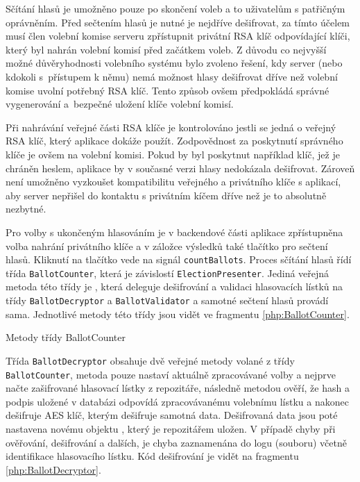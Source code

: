 Sčítání hlasů je umožněno pouze po skončení voleb a to uživatelům s patřičným oprávněním. Před sečtením hlasů je nutné je nejdříve dešifrovat, za tímto účelem musí člen volební komise serveru zpřístupnit privátní RSA klíč odpovídající klíči, který byl nahrán volební komisí před začátkem voleb. Z důvodu co nejvyšší možné důvěryhodnosti volebního systému bylo zvoleno řešení, kdy server (nebo kdokoli s~přístupem k němu) nemá možnost hlasy dešifrovat dříve než volební komise uvolní potřebný RSA klíč. Tento způsob ovšem předpokládá správné vygenerování a~bezpečné uložení klíče volební komisí.

Při nahrávání veřejné části RSA klíče je kontrolováno jestli se jedná o veřejný RSA klíč, který aplikace dokáže použít. Zodpovědnost za poskytnutí správného klíče je ovšem na volební komisi. Pokud by byl poskytnut například klíč, jež je chráněn heslem, aplikace by v současné verzi hlasy nedokázala dešifrovat. Zároveň není umožněno vyzkoušet kompatibilitu veřejného a privátního klíče s aplikací, aby server nepřišel do kontaktu s privátním kíčem dříve než je to absolutně nezbytné.

Pro volby s ukončeným hlasováním je v backendové části aplikace zpřístupněna volba nahrání privátního klíče a v záložce výsledků také tlačítko pro sečtení hlasů. Kliknutí na tlačítko vede na signál \texttt{countBallots}. Proces sčítání hlasů řídí třída \texttt{BallotCounter}, která je závislostí \texttt{ElectionPresenter}. Jediná veřejná metoda této třídy je %
, která deleguje dešifrování a validaci hlasovacích lístků na třídy \texttt{BallotDecryptor} a \texttt{BallotValidator} a samotné sečtení hlasů provádí sama. Jednotlivé metody této třídy jsou vidět ve fragmentu \ref{php:BallotCounter}.

\clearpage
\begin{listing}[ht]
\caption{Metody třídy BallotCounter}
\label{php:BallotCounter}
\end{listing}

\clearpage
Třída \texttt{BallotDecryptor} obsahuje dvě veřejné metody volané z třídy \texttt{BallotCounter}, metoda  pouze nastaví aktuálně zpracovávané volby a  nejprve načte zašifrované hlasovací lístky z repozitáře, následně metodou %
 ověří, že hash a podpis uložené v databázi odpovídá zpracovávanému volebnímu lístku a nakonec dešifruje AES klíč, kterým dešifruje samotná data. Dešifrovaná data jsou poté nastavena novému objektu , který je repozitářem uložen. V případě chyby při ověřování, dešifrování a dalších, je chyba zaznamenána do logu (souboru) včetně identifikace hlasovacího lístku. Kód dešifrování je vidět na fragmentu \ref{php:BallotDecryptor}.
  
